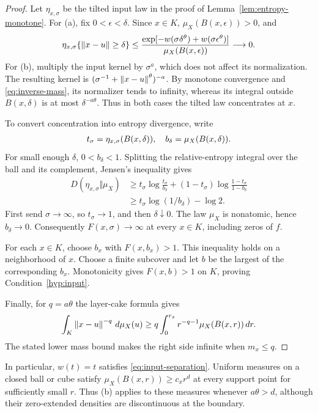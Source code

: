 \begin{proof}
Let $\eta_{x,\sigma}$ be the tilted input law in the proof of Lemma~\ref{lem:entropy-monotone}. For (a), fix $0<\epsilon<\delta$. Since $x\in K$, $\mu_X(B(x,\epsilon))>0$, and
\begin{align}
\eta_{x,\sigma}\{\left\lVert x-u\right\rVert\geq\delta\}
\leq\frac{\exp[-w(\sigma\delta^\theta)+w(\sigma\epsilon^\theta)]}
{\mu_X(B(x,\epsilon))}\longrightarrow0.
\end{align}
For (b), multiply the input kernel by $\sigma^a$, which does not affect its normalization. The resulting kernel is $(\sigma^{-1}+\left\lVert x-u\right\rVert^\theta)^{-a}$. By monotone convergence and \eqref{eq:inverse-mass}, its normalizer tends to infinity, whereas its integral outside $B(x,\delta)$ is at most $\delta^{-a\theta}$. Thus in both cases the tilted law concentrates at $x$.

To convert concentration into entropy divergence, write
\begin{align}
t_\sigma=\eta_{x,\sigma}(B(x,\delta)),\quad
b_\delta=\mu_X(B(x,\delta)).\notag
\end{align}
For small enough $\delta$, $0<b_\delta<1$. Splitting the relative-entropy integral over the ball and its complement, Jensen's inequality gives
\begin{align}
D(\eta_{x,\sigma}\Vert\mu_X)
&\geq t_\sigma\log\frac{t_\sigma}{b_\delta}
+(1-t_\sigma)\log\frac{1-t_\sigma}{1-b_\delta}\nonumber\\
&\geq t_\sigma\log(1/b_\delta)-\log2.
\end{align}
First send $\sigma\to\infty$, so $t_\sigma\to1$, and then $\delta\downarrow0$. The law $\mu_X$ is nonatomic, hence $b_\delta\to0$. Consequently $F(x,\sigma)\to\infty$ at every $x\in K$, including zeros of $f$.

For each $x\in K$, choose $b_x$ with $F(x,b_x)>1$. This inequality holds on a neighborhood of $x$. Choose a finite subcover and let $b$ be the largest of the corresponding $b_x$. Monotonicity gives $F(x,b)>1$ on $K$, proving Condition~\ref{hyp:input}.

Finally, for $q=a\theta$ the layer-cake formula gives
\begin{align}
\int_K\left\lVert x-u\right\rVert^{-q}\,d\mu_X(u)
\geq q\int_0^{r_x}r^{-q-1}\mu_X(B(x,r))\,d r.\notag
\end{align}
The stated lower mass bound makes the right side infinite when $m_x\leq q$.
\end{proof}

In particular, $w(t)=t$ satisfies \eqref{eq:input-separation}. Uniform measures on a closed ball or cube satisfy $\mu_X(B(x,r))\geq c_xr^d$ at every support point for sufficiently small $r$. Thus (b) applies to these measures whenever $a\theta>d$, although their zero-extended densities are discontinuous at the boundary.

